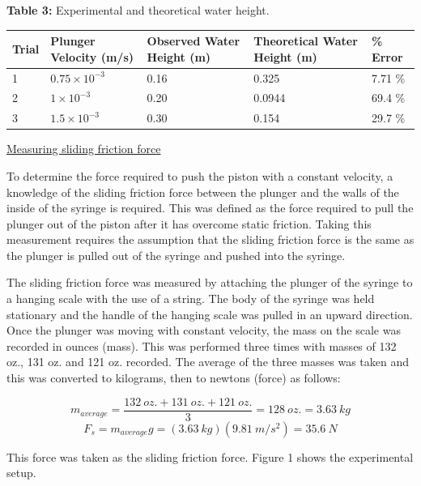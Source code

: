 \documentclass{article}
\begin{document}
\begin{center}\textbf{Table 3:} Experimental and theoretical water height. \end{center}
\begin{center}
\begin{tabular}{| p{1cm} | p{3.8cm} | p{3.7cm} | p{3.7cm} | p{2cm} |}
\hline
\textbf{Trial} & \textbf{Plunger Velocity (m/s)} & \textbf{Observed Water Height (m)} & \textbf{Theoretical Water Height (m)} & \textbf{\% Error} \\
\hline
1 & $0.75 \times 10^{-3}$ & 0.16 & 0.325 & 7.71 \% \\  
\hline
2 & $1 \times 10^{-3}$ & 0.20 & 0.0944 & 69.4 \% \\
\hline
3 & $1.5 \times 10^{-3}$ & 0.30 & 0.154 & 29.7 \% \\  
\hline
\end{tabular}
\end{center}

\underline{Measuring sliding friction force}

To determine the force required to push the piston with a constant velocity, a knowledge of the sliding friction force between the plunger and the walls of the inside of the syringe is required. 
This was defined as the force required to pull the plunger out of the piston after it has overcome static friction.
Taking this measurement requires the assumption that the sliding friction force is the same as the plunger is pulled out of the syringe and pushed into the syringe.

The sliding friction force was measured by attaching the plunger of the syringe to a hanging scale with the use of a string. 
The body of the syringe was held stationary and the handle of the hanging scale was pulled in an upward direction.
Once the plunger was moving with constant velocity, the mass on the scale was recorded in ounces (mass).
This was performed three times with masses of 132 oz., 131 oz. and 121 oz. recorded.
The average of the three masses was taken and this was converted to kilograms, then to newtons (force) as follows:

\[ m_{average} = \frac{132 \ oz. + 131 \ oz. + 121 \ oz.}{3} = 128 \ oz. = 3.63 \ kg \]
\[ F_{s} = m_{average}g = (3.63 \ kg)(9.81 \ m/s^2) = 35.6 \ N \] 

This force was taken as the sliding friction force. Figure 1 shows the experimental setup.
\end{document}
